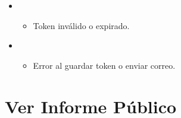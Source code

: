 \documentclass[a4paper,11pt,spanish]{sphinxmanual}
\begin{document}
\begin{fulllineitems}
\begin{itemize}
\begin{itemize}
\end{itemize}

\begin{sphinxVerbatim}[commandchars=\\\{\}]
\end{sphinxVerbatim}

\item {} 
\sphinxAtStartPar
{}
\begin{itemize}
\item {} 
\sphinxAtStartPar
Token inválido o expirado.

\end{itemize}

\item {} 
\sphinxAtStartPar
{}
\begin{itemize}
\item {} 
\sphinxAtStartPar
Error al guardar token o enviar correo.

\end{itemize}

\end{itemize}

\end{fulllineitems}



\section{Ver Informe Público}
\label{\detokenize{endpoints:ver-informe-publico}}
\end{document}
